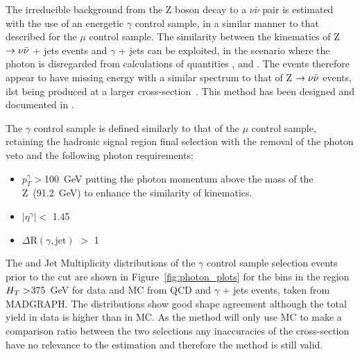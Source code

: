 The irreducible background from the Z boson decay to a $\nu \bar{\nu}$ pair is estimated with the use of an energetic $\gamma$ control sample, in a similar manner to that described for the $\mu$ control sample. The similarity between the kinematics of Z$ \rightarrow \nu \bar{\nu}$ + jets events and $\gamma$ + jets can be exploited, in the scenario where the photon is disregarded from calculations of quantities \HT, \MHT and \alt. The events therefore appear to have missing energy with a similar spectrum to that of Z $\rightarrow \nu \bar{\nu}$ events, ilst being produced at a larger cross-section~\cite{gamjetNLO}. This method has been designed and documented in \cite{SUS-10-001}.

The $\gamma$ control sample is defined similarly to that of the $\mu$ control sample, retaining the hadronic signal region final selection with the removal of the photon veto and the following photon requirements:

\begin{itemize}
\item $p^{\gamma}_{T} > $100~GeV putting the photon momentum above the mass of the Z~(91.2~GeV) to enhance the similarity of kinematics.
\item $| \eta^{\gamma}| <$ 1.45
\item $\Delta \textrm{R}(\gamma, \textrm{jet})$ $>$ 1
\end{itemize}

The \alt and Jet Multiplicity distributions of the $\gamma$ control sample selection events prior to the \alt cut are shown in Figure~\ref{fig:photon_plots} for the bins in the region $H_{T}  > $375~GeV for data and MC from QCD and $\gamma$ + jets events, taken from MADGRAPH. The distributions show good shape agreement although the total yield in data is higher than in MC. As the method will only use MC to make a comparison ratio between the two selections any inaccuracies of the cross-section have no relevance to the estimation and therefore the method is still valid.



